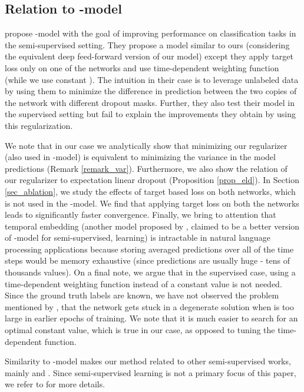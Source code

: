 \documentclass{article} \usepackage{iclr2018_conference,times}
\begin{document}
\subsection{Relation to \texorpdfstring{}{TEXT}-model}

\citet{laine2016temporal} propose -model with the goal of improving performance on classification tasks in the semi-supervised setting. They propose a model similar to ours (considering the equivalent deep feed-forward version of our model) except they apply target loss only on one of the networks and use time-dependent weighting function  (while we use constant ). The intuition in their case is to leverage unlabeled data by using them to minimize the difference in prediction between the two copies of the network with different dropout masks. Further, they also test their model in the supervised setting but fail to explain the improvements they obtain by using this regularization.

We note that in our case we analytically show that minimizing our regularizer (also used in -model) is equivalent to minimizing the variance in the model predictions (Remark \ref{remark_var}). Furthermore, we also show the relation of our regularizer to expectation linear dropout (Proposition \ref{prop_eld}). In Section \ref{sec_ablation}, we study the effects of target based loss on both networks, which is not used in the -model. We find that applying target loss on both the networks leads to significantly faster convergence. Finally, we bring to attention that temporal embedding (another model proposed by \citet{laine2016temporal}, claimed to be a better version of -model for semi-supervised, learning) is intractable in natural language processing applications because storing averaged predictions over all of the time steps would be memory exhaustive (since predictions are usually huge - tens of thousands values). On a final note, we argue that in the supervised case, using a time-dependent weighting function  instead of a constant value  is not needed. Since the ground truth labels are known, we have not observed the problem mentioned by \citet{laine2016temporal}, that the network gets stuck in a degenerate solution when  is too large in earlier epochs of training. We note that it is much easier to search for an optimal constant value, which is true in our case, as opposed to tuning the time-dependent function.

Similarity to -model makes our method related to other semi-supervised works, mainly \cite{ladder} and \cite{sajjadi2016regularization}. Since semi-supervised learning is not a primary focus of this paper, we refer to \cite{laine2016temporal} for more details.
\end{document}
